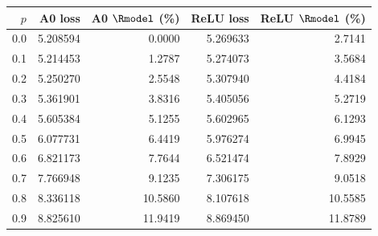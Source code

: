 \begin{tabular}{rrrrr}
\toprule
$p$ & A0 loss & A0 $\Rmodel$ (\%) & ReLU loss & ReLU $\Rmodel$ (\%) \\
\midrule
0.0 & 5.208594 & 0.0000 & 5.269633 & 2.7141 \\
0.1 & 5.214453 & 1.2787 & 5.274073 & 3.5684 \\
0.2 & 5.250270 & 2.5548 & 5.307940 & 4.4184 \\
0.3 & 5.361901 & 3.8316 & 5.405056 & 5.2719 \\
0.4 & 5.605384 & 5.1255 & 5.602965 & 6.1293 \\
0.5 & 6.077731 & 6.4419 & 5.976274 & 6.9945 \\
0.6 & 6.821173 & 7.7644 & 6.521474 & 7.8929 \\
0.7 & 7.766948 & 9.1235 & 7.306175 & 9.0518 \\
0.8 & 8.336118 & 10.5860 & 8.107618 & 10.5585 \\
0.9 & 8.825610 & 11.9419 & 8.869450 & 11.8789 \\
\bottomrule
\end{tabular}
